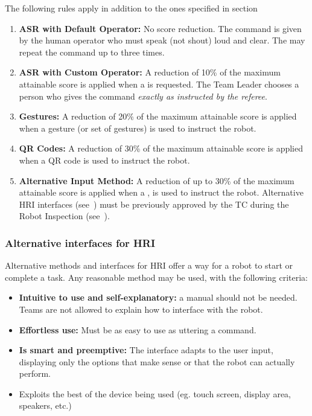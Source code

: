 The following rules apply in addition to the ones specified in section 
\begin{enumerate}
	\item \textbf{ASR with Default Operator:} No score reduction.
	The command is given by the human operator who must speak (not shout) loud and clear.
	The  may repeat the command up to three times.

	\item \textbf{ASR with Custom Operator:} A reduction of 10\% of the maximum attainable score is applied when a  is requested.
	The Team Leader chooses a person who gives the command \emph{exactly as instructed by the referee}.

	\item \textbf{Gestures:} A reduction of 20\% of the maximum attainable score is applied when a gesture (or set of gestures) is used to instruct the robot.

	\item \textbf{QR Codes:} A reduction of 30\% of the maximum attainable score is applied when a QR code is used to instruct the robot.

	\item \textbf{Alternative Input Method:} A reduction of up to 30\% of the maximum attainable score is applied when a , is used to instruct the robot.
	Alternative HRI interfaces (see~) must be previously approved by the TC during the Robot Inspection (see~).
\end{enumerate}


\subsubsection{Alternative interfaces for HRI}
\label{rule:asralternative}
Alternative methods and interfaces for HRI offer a way for a robot to start or complete a task.
Any reasonable method may be used, with the following criteria:
\begin{itemize}
	\item \textbf{Intuitive to use and self-explanatory:} a manual should not be needed. Teams are not allowed to explain how to interface with the robot. %

	\item \textbf{Effortless use:} Must be as easy to use as uttering a command. %

	\item \textbf{Is smart and preemptive:} The interface adapts to the user input, displaying only the options that make sense or that the robot can actually perform.

	\item Exploits the best of the device being used (eg. touch screen, display area, speakers, etc.)
\end{itemize}


